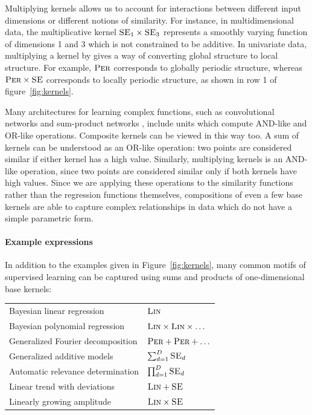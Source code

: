 \documentclass[twoside]{article}
\begin{document}
Multiplying kernels allows us to account for interactions between different input dimensions or different notions of similarity. 
For instance, in multidimensional data, the multiplicative kernel $\textsc{SE}_1 \times \textsc{SE}_3$ represents a smoothly varying function of dimensions 1 and 3 which is not constrained to be additive.
In univariate data, multiplying a kernel by \kSE{} gives a way of converting global structure to local structure. 
For example, $\textsc{Per}$ corresponds to globally periodic structure, whereas $\textsc{Per} \times \textsc{SE}$ corresponds to locally periodic structure, as shown in row 1 of figure~\ref{fig:kernels}.

Many architectures for learning complex functions, such as convolutional networks \cite{lecun1989backpropagation} and sum-product networks \cite{poon2011sum}, include units which compute AND-like and OR-like operations.
Composite kernels can be viewed in this way too. A sum of kernels can be understood as an OR-like operation: two points are considered similar if either kernel has a high value.
Similarly, multiplying kernels is an AND-like operation, since two points are considered similar only if both kernels have high values.
Since we are applying these operations to the similarity functions rather than the regression functions themselves, compositions of even a few base kernels are able to capture complex relationships in data which do not have a simple parametric form.

\paragraph{Example expressions}

In addition to the examples given in Figure~\ref{fig:kernels}, many common motifs of supervised learning can be captured using sums and products of one-dimensional base kernels:

\begin{tabular}{l|l}
Bayesian linear regression & $\textsc{Lin}$ \\
Bayesian polynomial regression & $\textsc{Lin} \times \textsc{Lin} \times \ldots$\\
Generalized Fourier decomposition & $\textsc{Per} + \textsc{Per} + \ldots$ \\
Generalized additive models & $\sum_{d=1}^D \textsc{SE}_d$ \\
Automatic relevance determination & $\prod_{d=1}^D \textsc{SE}_d$ \\
Linear trend with deviations & $\textsc{Lin} + \textsc{SE}$ \\
Linearly growing amplitude & $\textsc{Lin} \times \textsc{SE}$
\end{tabular}
\end{document}
